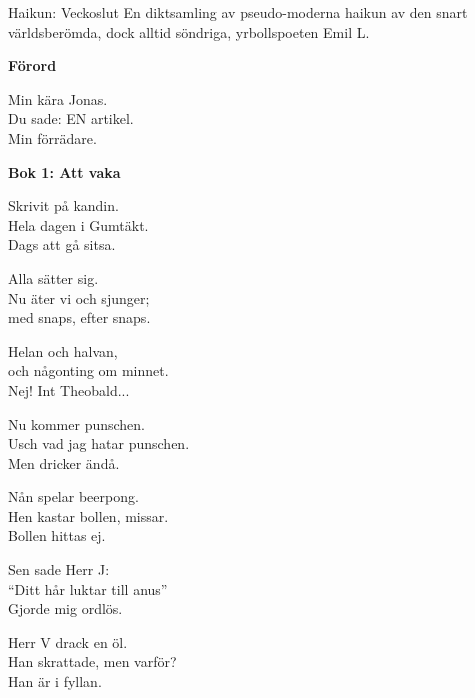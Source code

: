 \documentclass{spektraklet}
\begin{document}
\begin{artikel}{Haikun: Veckoslut}{}
En diktsamling av pseudo-moderna haikun av den snart världsberömda, dock alltid söndriga, yrbollspoeten Emil L.
\vspace{0.5cm}

\textbf{Förord}

Min kära Jonas.\\
Du sade: EN artikel.\\
Min förrädare.


\vspace{0.8cm}

\textbf{Bok 1: Att vaka}

\begin{flushleft}
Skrivit på kandin.\\
Hela dagen i Gumtäkt.\\
Dags att gå sitsa.
\end{flushleft}

\begin{center}
Alla sätter sig.\\
Nu äter vi och sjunger;\\
med snaps, efter snaps.
\end{center}

\begin{flushright}
Helan och halvan,\\
och någonting om minnet.\\
Nej! Int Theobald...
\end{flushright}

\begin{flushleft}
Nu kommer punschen.\\
Usch vad jag hatar punschen.\\
Men dricker ändå.
\end{flushleft}

\begin{center}
Nån spelar beerpong.\\
Hen kastar bollen, missar.\\
Bollen hittas ej.
\end{center}

\begin{flushright}
Sen sade Herr J:\\
``Ditt hår luktar till anus''\\
Gjorde mig ordlös.
\end{flushright}

\begin{flushleft}
Herr V drack en öl.\\
Han skrattade, men varför?\\
Han är i fyllan.
\end{flushleft}


\end{artikel}
\end{document}
